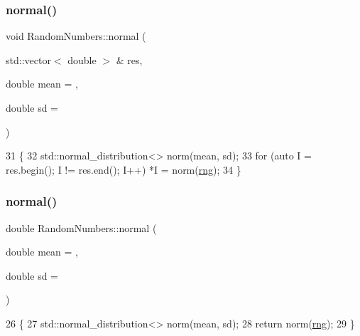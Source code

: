 \subsubsection{\texorpdfstring{normal()}{normal()}\hspace{0.1cm}{\footnotesize\ttfamily [1/2]}}
{\footnotesize\ttfamily void Random\+Numbers\+::normal (\begin{DoxyParamCaption}\item[{std\+::vector$<$ double $>$ \&}]{res,  }\item[{double}]{mean = {},  }\item[{double}]{sd = {} }\end{DoxyParamCaption})}


\begin{DoxyCode}
31                                                                          \{
32     std::normal\_distribution<> norm(mean, sd);
33     \textcolor{keywordflow}{for} (\textcolor{keyword}{auto} I = res.begin(); I != res.end(); I++) *I = norm(\mbox{\hyperlink{classRandomNumbers_a15ceee85d6d00de12ae76c90aaec2f14}{rng}});
34 \}
\end{DoxyCode}
\mbox{\label{classRandomNumbers_abbfcbae72e7dbd048567dd5b8e2ce9d2}} 
\subsubsection{\texorpdfstring{normal()}{normal()}\hspace{0.1cm}{\footnotesize\ttfamily [2/2]}}
{\footnotesize\ttfamily double Random\+Numbers\+::normal (\begin{DoxyParamCaption}\item[{double}]{mean = {},  }\item[{double}]{sd = {} }\end{DoxyParamCaption})}


\begin{DoxyCode}
26                                                    \{
27     std::normal\_distribution<> norm(mean, sd);
28     \textcolor{keywordflow}{return} norm(\mbox{\hyperlink{classRandomNumbers_a15ceee85d6d00de12ae76c90aaec2f14}{rng}});
29 \}
\end{DoxyCode}
\mbox{\label{classRandomNumbers_a69e33058b8a923f9597cf13421d5fcd4}} 

